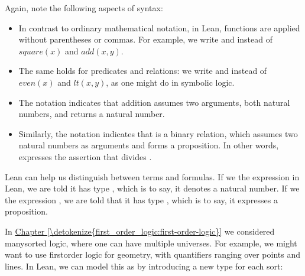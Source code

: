 \documentclass[letterpaper,10pt,english]{sphinxmanual}
\begin{document}
\sphinxAtStartPar
Again, note the following aspects of syntax:
\begin{itemize}
\item {} 
\sphinxAtStartPar
In contrast to ordinary mathematical notation, in Lean,
functions are applied without parentheses or commas.
For example, we write  and 
instead of \(\mathit{square}(x)\) and \(\mathit{add}(x, y)\).

\item {} 
\sphinxAtStartPar
The same holds for predicates and relations:
we write  and  instead of \(\mathit{even}(x)\)
and \(\mathit{lt}(x, y)\), as one might do in symbolic logic.

\item {} 
\sphinxAtStartPar
The notation 
indicates that addition assumes two arguments, both natural numbers,
and returns a natural number.

\item {} 
\sphinxAtStartPar
Similarly, the notation 
indicates that  is a binary relation,
which assumes two natural numbers as arguments and forms a proposition.
In other words,  expresses the assertion that 
divides .

\end{itemize}

\sphinxAtStartPar
Lean can help us distinguish between terms and formulas.
If we  the expression  in Lean,
we are told it has type , which is to say, it denotes a natural number.
If we  the expression ,
we are told that it has type , which is to say,
it expresses a proposition.

\sphinxAtStartPar
In \hyperref[\detokenize{first_order_logic:first-order-logic}]{Chapter \ref{\detokenize{first_order_logic:first-order-logic}}} we considered many\sphinxhyphen{}sorted logic,
where one can have multiple universes.
For example, we might want to use first\sphinxhyphen{}order logic for geometry,
with quantifiers ranging over points and lines.
In Lean, we can model this as by introducing a new type for each sort:
\end{document}
